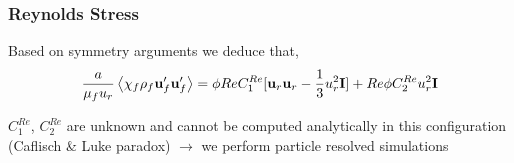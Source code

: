 \documentclass{sintefbeamer}
\begin{document}
\begin{frame}
  \frametitle{Reynolds Stress}

Based on symmetry arguments we deduce that,
  \begin{align*}
    \frac{a}{\mu_f u_r} \left<\chi_f\rho_f\textbf{u}_f'\textbf{u}_f'\right>
     =
     \phi Re C_1^{Re}
    [
      \textbf{u}_r\textbf{u}_r - \frac{1}{3}u_r ^2\textbf{I} 
      ]
      + Re \phi  C_2^{Re} u_r ^2 \textbf{I}
  \end{align*} 

  $C_1^{Re}$, $C_2^{Re}$ are unknown and cannot be computed analytically in this configuration (Caflisch \& Luke paradox) $\rightarrow$ we perform particle resolved simulations 
\end{frame}
\end{document}
